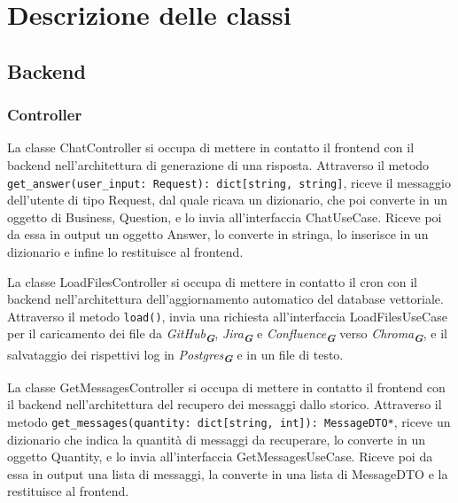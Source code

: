 
\section{Descrizione delle classi}
\label{sec:descrizione_classi}

\subsection{Backend}
\label{sec:backend}

\subsubsection{Controller}
\label{sec:controller}

\label{sec:chat_controller}
La classe ChatController si occupa di mettere in contatto il frontend con il backend nell'architettura di generazione di una risposta. Attraverso il metodo \texttt{get\_answer(user\_input: Request): dict[string, string]}, riceve il messaggio dell'utente di tipo Request, dal quale ricava un dizionario, che poi converte in un oggetto di Business, Question, e lo invia all'interfaccia ChatUseCase. Riceve poi da essa in output un oggetto Answer, lo converte in stringa, lo inserisce in un dizionario e infine lo restituisce al frontend.

\label{sec:load_files_controller}
La classe LoadFilesController si occupa di mettere in contatto il cron con il backend nell'architettura dell'aggiornamento automatico del database vettoriale. Attraverso il metodo \texttt{load()}, invia una richiesta all'interfaccia LoadFilesUseCase per il caricamento dei file da \emph{GitHub}\textsubscript{\textbf{\textit{G}}}, \emph{Jira}\textsubscript{\textbf{\textit{G}}} e \emph{Confluence}\textsubscript{\textbf{\textit{G}}} verso \emph{Chroma}\textsubscript{\textbf{\textit{G}}}, e il salvataggio dei rispettivi log in \emph{Postgres}\textsubscript{\textbf{\textit{G}}} e in un file di testo.

\label{sec:get_messages_controller}
La classe GetMessagesController si occupa di mettere in contatto il frontend con il backend nell'architettura del recupero dei messaggi dallo storico. Attraverso il metodo \texttt{get\_messages(quantity: dict[string, int]): MessageDTO*}, riceve un dizionario che indica la quantità di messaggi da recuperare, lo converte in un oggetto Quantity, e lo invia all'interfaccia GetMessagesUseCase. Riceve poi da essa in output una lista di messaggi, la converte in una lista di MessageDTO e la restituisce al frontend.

